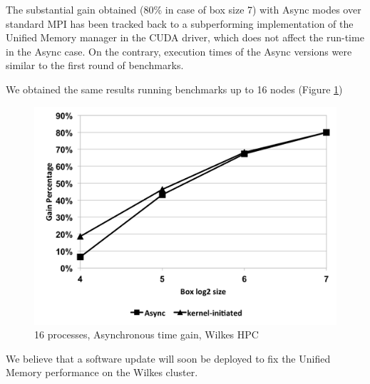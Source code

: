 \documentclass[conference]{IEEEtran}
\begin{document}
The substantial gain obtained (80\% in case of box size 7) with Async modes
over standard MPI has been tracked back to a subperforming implementation
of the Unified Memory manager in the CUDA driver, which does not affect the
run-time in the Async case.
%
On the contrary, execution times of the Async versions were similar
to the first round of benchmarks. 

We obtained the same results running benchmarks up to 16 nodes (Figure \ref{fig:gain_wilkes16})

\begin{figure}[h]
\includegraphics[scale=0.5]{gain_wilkes16.png}
\caption{16 processes, Asynchronous time gain, Wilkes HPC}
\label{fig:gain_wilkes16}
\end{figure}



We believe that a software update will soon be deployed to fix the Unified
Memory performance on the Wilkes cluster.

\end{document}
